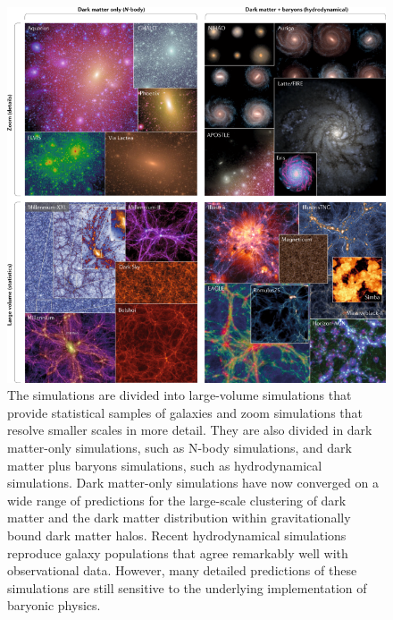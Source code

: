 \documentclass{book}
\begin{document}
\begin{figure}[!htb]
    \centering
    \includegraphics[scale=0.6]{img/cosmo-sims.png}
    \caption{The simulations are divided into large-volume
simulations that provide statistical samples of galaxies and zoom simulations that
resolve smaller scales in more detail. They are also divided in dark matter-only
simulations, such as N-body simulations, and dark matter plus baryons
simulations, such as hydrodynamical simulations. Dark matter-only simulations
have now converged on a wide range of predictions for the large-scale clustering
of dark matter and the dark matter distribution within gravitationally bound dark
matter halos. Recent hydrodynamical simulations reproduce galaxy populations
that agree remarkably well with observational data. However, many detailed
predictions of these simulations are still sensitive to the underlying
implementation of baryonic physics. }
    \label{fig:enter-label}
\end{figure}
\end{document}
